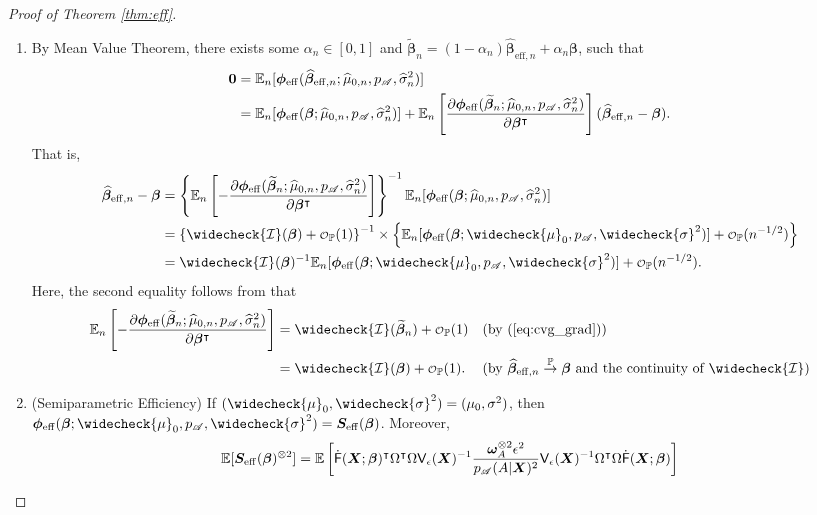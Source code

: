 \documentclass[11pt]{article}
\numberwithin{equation}{section}
\theoremstyle{definition}
\theoremstyle{remark}
\newcommand{\bS}{\bm{S}}
\newcommand{\bX}{\bm{X}}
\newcommand{\bbeta}{\bm{\beta}}
\newcommand{\bomega}{\bm{\omega}}
\newcommand{\bphi}{\bm{\phi}}
\newcommand{\bbE}{\mathbb{E}}
\newcommand{\bbP}{\mathbb{P}}
\newcommand{\cI}{\mathcal{I}}
\newcommand{\sA}{\mathscr{A}}
\newcommand{\sfF}{\mathsf{F}}
\newcommand{\sfV}{\mathsf{V}}
\newcommand\smallcO{
	\mathchoice
	{{\scriptstyle\mathcal{O}}}%
	{{\scriptstyle\mathcal{O}}}%
	{{\scriptscriptstyle\mathcal{O}}}%
	{\scalebox{.5}{$\scriptscriptstyle\mathcal{O}$}}%
}
\newcommand{\bzero}{\mathbf{0}}	%
\newcommand{\eff}{\mathrm{eff}}
\begin{document}
\begin{proof}[Proof of Theorem \ref{thm:eff}]
\begin{enumerate}[label=\textbf{Step \Roman*:},leftmargin=0cm]
		\item By Mean Value Theorem, there exists some $ \alpha_{n} \in [0,1] $ and $ \widetilde{\bbeta}_{n} = (1-\alpha_{n})\widehat{\bbeta}_{\eff,n} + \alpha_{n}\bbeta $, such that
		\begin{align*}
			\bzero &= \bbE_{n}[\bphi_{\eff}(\widehat{\bbeta}_{\eff,n};\widehat{\mu}_{0,n},p_{\sA},\widehat{\sigma}_{n}^{2})]\\
			&= \bbE_{n}[\bphi_{\eff}(\bbeta;\widehat{\mu}_{0,n},p_{\sA},\widehat{\sigma}_{n}^{2})] + \bbE_{n}\left[ {\partial \bphi_{\eff}(\widetilde{\bbeta}_{n};\widehat{\mu}_{0,n},p_{\sA},\widehat{\sigma}_{n}^{2}) \over \partial \bbeta^{\intercal}} \right](\widehat{\bbeta}_{\eff,n} - \bbeta).
		\end{align*}
		That is,
		\begin{align*}
			\widehat{\bbeta}_{\eff,n} - \bbeta &= \left\{ \bbE_{n}\left[ -{\partial \bphi_{\eff}(\widetilde{\bbeta}_{n};\widehat{\mu}_{0,n},p_{\sA},\widehat{\sigma}_{n}^{2}) \over \partial \bbeta^{\intercal}} \right] \right\}^{-1}\bbE_{n}[\bphi_{\eff}(\bbeta;\widehat{\mu}_{0,n},p_{\sA},\widehat{\sigma}_{n}^{2})]\\
			&= \left\{ \widecheck{\cI}(\bbeta) + \smallcO_{\bbP}(1) \right\}^{-1}\times\left\{ \bbE_{n}[\bphi_{\eff}(\bbeta;\widecheck{\mu}_{0},p_{\sA},\widecheck{\sigma}^{2})] + \smallcO_{\bbP}(n^{-1/2}) \right\}\\
			&= \widecheck{\cI}(\bbeta)^{-1}\bbE_{n}[\bphi_{\eff}(\bbeta;\widecheck{\mu}_{0},p_{\sA},\widecheck{\sigma}^{2})] + \smallcO_{\bbP}(n^{-1/2}).
		\end{align*}
		Here, the second equality follows from that
		\begin{align*}
			\bbE_{n}\left[ -{\partial \bphi_{\eff}(\widetilde{\bbeta}_{n};\widehat{\mu}_{0,n},p_{\sA},\widehat{\sigma}_{n}^{2}) \over \partial \bbeta^{\intercal}}\right] &= \widecheck{\cI}(\widetilde{\bbeta}_{n}) + \smallcO_{\bbP}(1) &&(\text{by (\ref{eq:cvg_grad})})\\
			&= \widecheck{\cI}(\bbeta) + \smallcO_{\bbP}(1). &&(\text{by $ \widehat{\bbeta}_{\eff,n} \stackrel{\bbP}{\to} \bbeta $ and the continuity of  $ \widecheck{\cI} $})
		\end{align*}
		\item (Semiparametric Efficiency) If $ (\widecheck{\mu}_{0},\widecheck{\sigma}^{2}) = (\mu_{0},\sigma^{2}) $, then $ \bphi_{\eff}(\bbeta;\widecheck{\mu}_{0},p_{\sA},\widecheck{\sigma}^{2}) = \bS_{\eff}(\bbeta) $. Moreover,
		\begin{align*}
			\bbE[\bS_{\eff}(\bbeta)^{\otimes 2}] &= \bbE\left[ \dot{\sfF}(\bX;\bbeta)^{\intercal}\Omega^{\intercal}\Omega\sfV_{\epsilon}(\bX)^{-1}{\bomega_{A}^{\otimes 2}\epsilon^{2} \over p_{\sA}(A|\bX)^{2}} \sfV_{\epsilon}(\bX)^{-1}\Omega^{\intercal}\Omega\dot{\sfF}(\bX;\bbeta) \right]\\

\end{align*}
\end{enumerate}
\end{proof}
\end{document}
